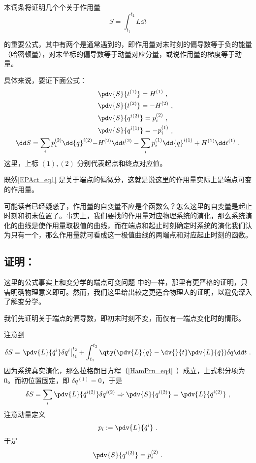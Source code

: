 
本词条将证明几个个关于作用量
\begin{equation}
S=\int_{t_1}^{t_2}L\dd t
\end{equation}

的重要公式，其中有两个是通常遇到的，即作用量对末时刻的偏导数等于负的能量（哈密顿量），对末坐标的偏导数等于动量对应分量，或说作用量的梯度等于动量。

具体来说，要证下面公式：
\begin{equation}\label{EPAct_eq1}
\begin{aligned}
&\pdv{S}{t^{(1)}}=H^{(1)}~,\\
&\pdv{S}{t^{(2)}}=-H^{(2)}~,\\
&\pdv{S}{{q}^{i(2)}}=p_i^{(2)}~,\\
&\pdv{S}{{q}^{i (1)}}=-p_i^{(1)}~,\\
\dd S=\sum_i p_i^{(2)}\dd {q}^{i (2)}-&H^{(2)}\dd t^{(2)}-\sum_i p_i^{(1)}\dd {q}^{i (1)}+H^{(1)}\dd t^{(1)}~.
\end{aligned}
\end{equation}
这里，上标 $(1),(2)$ 分别代表起点和终点对应值。

既然\autoref{EPAct_eq1} 是关于端点的偏微分，这就是说这里的作用量实际上是端点可变的作用量。

可能读者已经疑惑了，作用量的自变量不应是个函数么？怎么这里的自变量是起止时刻和初末位置了。事实上，我们要找的作用量对应物理系统的演化，那么系统演化的曲线是使作用量取极值的曲线，而在端点和起止时刻确定时系统的演化我们认为只有一个，那么作用量就可看成这一极值曲线的两端点和对应起止时刻的函数。
\subsection{证明：}
这里的公式事实上和变分学的端点可变问题 中的一样，那里有更严格的证明，只需明确物理意义即可。然而，我们这里给出较之更适合物理人的证明，以避免深入了解变分学。

我们先证明关于端点的偏导数，即初末时刻不变，而仅有一端点变化时的情形。

注意到
\begin{equation}
\delta S=\left.\pdv{L}{\dot q^i}\delta q^i\right|_{t_1}^{t_2}+\int_{t_1}^{t_2}\qty(\pdv{L}{q}-\dv{}{t}\pdv{L}{\dot q})\delta q\dd t~.
\end{equation}
因为系统真实演化，那么拉格朗日方程（\autoref{HamPrn_eq4}~）成立，上式积分项为0。而初位置固定，即 $\delta q^{(1)}=0$，于是
\begin{equation}
\delta S=\sum_i\pdv{L}{{\dot q}^{i (2)}}\delta {q}^{i (2)}\Rightarrow \pdv{S}{{q}^{i (2)}}=\pdv{L}{{\dot q}^{i (2)}}~,
\end{equation}
注意动量定义
\begin{equation}
p_i:=\pdv{L}{\dot q^i}~.
\end{equation}
于是
\begin{equation}
\pdv{S}{{q}^{i (2)}}=p_i^{(2)}~.
\end{equation}

